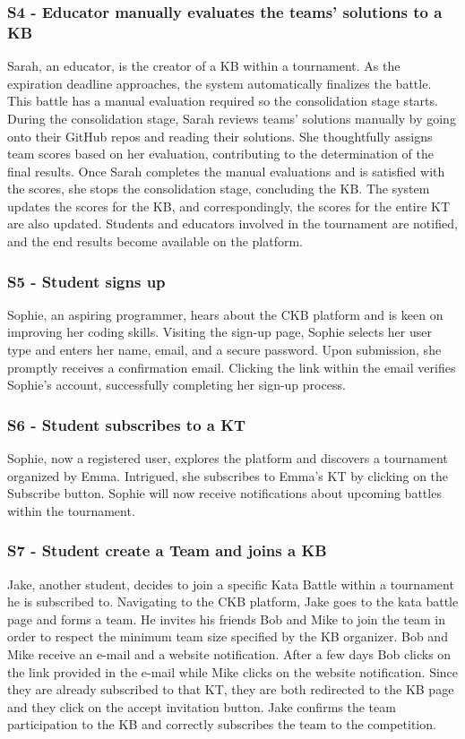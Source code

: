 \documentclass[11pt]{report}
\begin{document}
\subsubsection{S4 - Educator manually evaluates the teams' solutions to a KB}
    Sarah, an educator, is the creator of a KB within a tournament.
    As the expiration deadline approaches, the system automatically finalizes the battle.
    This battle has a manual evaluation required so the consolidation stage starts.
    During the consolidation stage, Sarah reviews teams' solutions manually by going onto their GitHub repos and reading their solutions.
    She thoughtfully assigns team scores based on her evaluation, contributing to the determination of the final results.
    Once Sarah completes the manual evaluations and is satisfied with the scores, she stops the consolidation stage, concluding the KB\@.
    The system updates the scores for the KB, and correspondingly, the scores for the entire KT are also updated.
    Students and educators involved in the tournament are notified, and the end results become available on the platform.
\subsubsection{S5 - Student signs up}
    Sophie, an aspiring programmer, hears about the CKB platform and is keen on improving her coding skills.
    Visiting the sign-up page, Sophie selects her user type and enters her name, email, and a secure password.
    Upon submission, she promptly receives a confirmation email.
    Clicking the link within the email verifies Sophie's account, successfully completing her sign-up process.
\subsubsection{S6 - Student subscribes to a KT}
    Sophie, now a registered user, explores the platform and discovers a tournament organized by Emma.
    Intrigued, she subscribes to Emma's KT by clicking on the Subscribe button\@.
    Sophie will now receive notifications about upcoming battles within the tournament.
\subsubsection{S7 - Student create a Team and joins a KB}
    Jake, another student, decides to join a specific Kata Battle within a tournament he is subscribed to.
    Navigating to the CKB platform, Jake goes to the kata battle page and forms a team.
    He invites his friends Bob and Mike to join the team in order to respect the minimum team size specified by the KB organizer.
    Bob and Mike receive an e-mail and a website notification.
    After a few days Bob clicks on the link provided in the e-mail while Mike clicks on the website notification.
    Since they are already subscribed to that KT, they are both redirected to the KB page and they click on the accept invitation button.
    Jake confirms the team participation to the KB and correctly subscribes the team to the competition\@.
\end{document}
